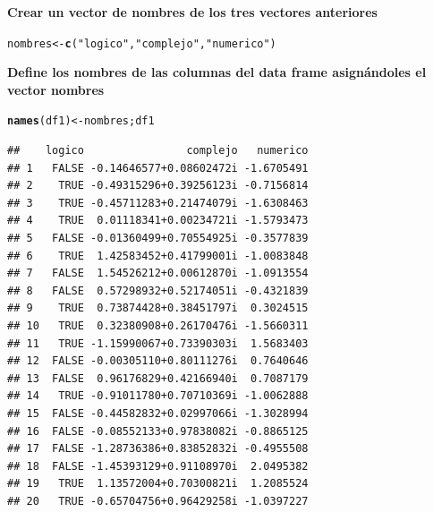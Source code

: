 \documentclass[12pt,letterpaper]{article}\usepackage[]{graphicx}\usepackage[]{color}
\makeatletter
\newcommand{\hlstr}[1]{\textcolor[rgb]{0.192,0.494,0.8}{#1}}%
\newcommand{\hlstd}[1]{\textcolor[rgb]{0.345,0.345,0.345}{#1}}%
\newcommand{\hlkwb}[1]{\textcolor[rgb]{0.69,0.353,0.396}{#1}}%
\newcommand{\hlkwd}[1]{\textcolor[rgb]{0.737,0.353,0.396}{\textbf{#1}}}%
\newenvironment{kframe}{%
 \def\at@end@of@kframe{}%
 \ifinner\ifhmode%
  \def\at@end@of@kframe{\end{minipage}}%
  \begin{minipage}{\columnwidth}%
 \fi\fi%
 \def\FrameCommand##1{\hskip\@totalleftmargin \hskip-\fboxsep
 \colorbox{shadecolor}{##1}\hskip-\fboxsep
     \hskip-\linewidth \hskip-\@totalleftmargin \hskip\columnwidth}%
 \MakeFramed {\advance\hsize-\width
   \@totalleftmargin\z@ \linewidth\hsize
   \@setminipage}}%
 {\par\unskip\endMakeFramed%
 \at@end@of@kframe}
\newenvironment{knitrout}{}{} %
\makeatother
\begin{document}
\textbf{Crear un vector de nombres de los tres vectores anteriores}
\begin{knitrout}
\color{fgcolor}\begin{kframe}
\begin{alltt}
\hlstd{nombres} \hlkwb{<-} \hlkwd{c}\hlstd{(}\hlstr{"logico"}\hlstd{,} \hlstr{"complejo"}\hlstd{,} \hlstr{"numerico"}\hlstd{)}
\end{alltt}
\end{kframe}
\end{knitrout}

\textbf{Define los nombres de las columnas del data frame asign\'andoles el vector nombres}
\begin{knitrout}
\color{fgcolor}\begin{kframe}
\begin{alltt}
\hlkwd{names}\hlstd{(df1)} \hlkwb{<-} \hlstd{nombres; df1}
\end{alltt}
\begin{verbatim}
##    logico                complejo   numerico
## 1   FALSE -0.14646577+0.08602472i -1.6705491
## 2    TRUE -0.49315296+0.39256123i -0.7156814
## 3    TRUE -0.45711283+0.21474079i -1.6308463
## 4    TRUE  0.01118341+0.00234721i -1.5793473
## 5   FALSE -0.01360499+0.70554925i -0.3577839
## 6    TRUE  1.42583452+0.41799001i -1.0083848
## 7   FALSE  1.54526212+0.00612870i -1.0913554
## 8   FALSE  0.57298932+0.52174051i -0.4321839
## 9    TRUE  0.73874428+0.38451797i  0.3024515
## 10   TRUE  0.32380908+0.26170476i -1.5660311
## 11   TRUE -1.15990067+0.73390303i  1.5683403
## 12  FALSE -0.00305110+0.80111276i  0.7640646
## 13  FALSE  0.96176829+0.42166940i  0.7087179
## 14   TRUE -0.91011780+0.70710369i -1.0062888
## 15  FALSE -0.44582832+0.02997066i -1.3028994
## 16  FALSE -0.08552133+0.97838082i -0.8865125
## 17  FALSE -1.28736386+0.83852832i -0.4955508
## 18  FALSE -1.45393129+0.91108970i  2.0495382
## 19   TRUE  1.13572004+0.70300821i  1.2085524
## 20   TRUE -0.65704756+0.96429258i -1.0397227
\end{verbatim}
\end{kframe}
\end{knitrout}
\end{document}
